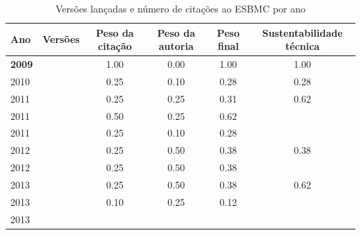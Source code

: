 \begin{table}[H]
\caption{Versões lançadas e número de citações ao ESBMC por ano}
\centering
\begin{tabular}{| l | c | c | c | c | c |}
  \hline
  Ano & Versões & Peso da citação & Peso da autoria & Peso final & Sustentabilidade técnica \\
  \hline
            {\bf 2009}
          &
          
          &
          1.00
          &
          0.00
          &
          1.00
          &
            {\color{blue} 1.00}
          \\
\hline
            2010
          &
          
          &
          0.25
          &
          0.10
          &
          0.28
          &
            {\color{red} 0.28}
          \\
\hline
            2011
          &
          
          &
          0.25
          &
          0.25
          &
          0.31
          &
            {\color{blue} 0.62}
          \\
            2011
          &
          
          &
          0.50
          &
          0.25
          &
          0.62
          &
          \\
            2011
          &
          
          &
          0.25
          &
          0.10
          &
          0.28
          &
          \\
\hline
            2012
          &
          
          &
          0.25
          &
          0.50
          &
          0.38
          &
            {\color{red} 0.38}
          \\
            2012
          &
          
          &
          0.25
          &
          0.50
          &
          0.38
          &
          \\
\hline
            2013
          &
          
          &
          0.25
          &
          0.50
          &
          0.38
          &
            {\color{blue} 0.62}
          \\
            2013
          &
          
          &
          0.10
          &
          0.25
          &
          0.12
          &
          \\
            2013
          &
          

\end{tabular}
\end{table}
